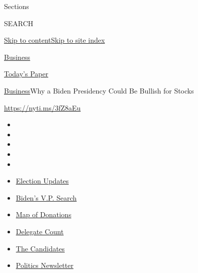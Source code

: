 Sections

SEARCH

\protect\hyperlink{site-content}{Skip to
content}\protect\hyperlink{site-index}{Skip to site index}

\href{https://www.nytimes.com/section/business}{Business}

\href{https://myaccount.nytimes.com/auth/login?response_type=cookie\&client_id=vi}{}

\href{https://www.nytimes.com/section/todayspaper}{Today's Paper}

\href{/section/business}{Business}\textbar{}Why a Biden Presidency Could
Be Bullish for Stocks

\url{https://nyti.ms/3fZ8aEu}

\begin{itemize}
\item
\item
\item
\item
\item
\end{itemize}

\begin{itemize}
\item
  \href{https://www.nytimes.com/2020/07/31/us/elections/biden-vs-trump.html?action=click\&pgtype=Article\&state=default\&region=TOP_BANNER\&context=storylines_menu}{Election
  Updates}
\item
  \href{https://www.nytimes.com/article/biden-vice-president-2020.html?action=click\&pgtype=Article\&state=default\&region=TOP_BANNER\&context=storylines_menu}{Biden's
  V.P. Search}
\item
  \href{https://www.nytimes.com/interactive/2020/07/24/us/politics/trump-biden-campaign-donors.html?action=click\&pgtype=Article\&state=default\&region=TOP_BANNER\&context=storylines_menu}{Map
  of Donations}
\item
  \href{https://www.nytimes.com/interactive/2020/us/elections/delegate-count-primary-results.html?action=click\&pgtype=Article\&state=default\&region=TOP_BANNER\&context=storylines_menu}{Delegate
  Count}
\item
  \href{https://www.nytimes.com/interactive/2019/us/politics/2020-presidential-candidates.html?action=click\&pgtype=Article\&state=default\&region=TOP_BANNER\&context=storylines_menu}{The
  Candidates}
\item
  \href{https://www.nytimes.com/newsletters/politics?action=click\&pgtype=Article\&state=default\&region=TOP_BANNER\&context=storylines_menu}{Politics
  Newsletter}
\end{itemize}

